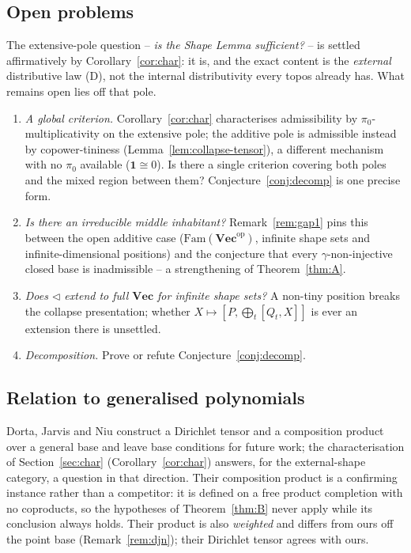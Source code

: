 \documentclass[11pt]{amsart}
\theoremstyle{plain}
\theoremstyle{definition}
\newcommand{\Fam}{\mathrm{Fam}}
\newcommand{\Vecb}{\mathbf{Vec}}
\newcommand{\op}{\mathrm{op}}
\newcommand{\comp}{\mathbin{\triangleleft}}
\newcommand{\one}{\mathbf{1}}
\newcommand{\pizero}{\pi_0}
\begin{document}
\subsection*{Open problems}
The extensive-pole question -- \emph{is the Shape Lemma sufficient?} -- is settled affirmatively by
Corollary~\ref{cor:char}: it is, and the exact content is the \emph{external} distributive law (D),
not the internal distributivity every topos already has. What remains open lies off that pole.
\begin{enumerate}[leftmargin=2em]
\item \emph{A global criterion.} Corollary~\ref{cor:char} characterises admissibility by
$\pizero$-multiplicativity on the extensive pole; the additive pole is admissible instead by
copower-tininess (Lemma~\ref{lem:collapse-tensor}), a different mechanism with no $\pizero$ available
($\one\cong0$). Is there a single criterion covering both poles and the mixed region between them?
Conjecture~\ref{conj:decomp} is one precise form.
\item \emph{Is there an irreducible middle inhabitant?} Remark~\ref{rem:gap1} pins this between the
open additive case ($\Fam(\Vecb^{\op})$, infinite shape sets and infinite-dimensional positions) and
the conjecture that every $\gamma$-non-injective closed base is inadmissible -- a strengthening of
Theorem~\ref{thm:A}.
\item \emph{Does $\comp$ extend to full $\Vecb$ for infinite shape sets?} A non-tiny position breaks
the collapse presentation; whether $X\mapsto[P,\bigoplus_t[Q_t,X]]$ is ever an extension there is
unsettled.
\item \emph{Decomposition.} Prove or refute Conjecture~\ref{conj:decomp}.
\end{enumerate}

\subsection*{Relation to generalised polynomials}
Dorta, Jarvis and Niu \cite{DJN} construct a Dirichlet tensor and a composition product over a general
base and leave base conditions for future work; the characterisation of Section~\ref{sec:char}
(Corollary~\ref{cor:char}) answers, for the external-shape category, a question in that direction. Their composition product is a confirming
instance rather than a competitor: it is defined on a free product completion with no coproducts, so
the hypotheses of Theorem~\ref{thm:B} never apply while its conclusion always holds. Their product is
also \emph{weighted} and differs from ours off the point base (Remark~\ref{rem:djn}); their Dirichlet
tensor agrees with ours.
\end{document}
